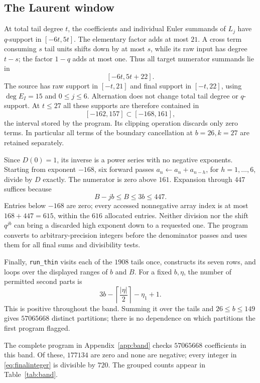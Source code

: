 \subsection{The Laurent window}
At total tail degree \(t\), the coefficients and individual Euler
summands of \(L_j\) have \(q\)-support in \([-6t,5t]\).
The elementary factor adds at most \(21\). A cross term consuming
\(s\) tail units shifts down by at most \(s\), while its raw input has
degree \(t-s\); the factor \(1-q\) adds at most one.
Thus all target numerator summands lie in
\[
                      [-6t,5t+22].
\]
The source has raw support in \([-t,21]\) and final support in
\([-t,22]\), using \(\deg E_I=15\) and \(0\le j\le6\).
Alternation does not change total tail degree or \(q\)-support.
At \(t\le27\) all these supports are therefore contained in
\[
                       [-162,157]\subset[-168,161],
\]
the interval stored by the program. Its clipping operation discards
only zero terms. In particular all terms of the boundary cancellation
at \(b=26,k=27\) are retained separately.

Since \(D(0)=1\), its inverse is a power series with no negative
exponents. Starting from exponent \(-168\), six forward passes
\(a_n\gets a_n+a_{n-h}\), for \(h=1,\ldots,6\), divide by \(D\)
exactly. The numerator is zero above \(161\).
Expansion through \(447\) suffices because
\[
                         B-jb\le B\le3b\le447.
\]
Entries below \(-168\) are zero; every accessed nonnegative array index
is at most \(168+447=615\), within the \(616\) allocated entries.
Neither division nor the shift \(q^{jb}\) can bring a discarded high
exponent down to a requested one. The program converts to
arbitrary-precision integers before the denominator passes and uses them
for all final sums and divisibility tests.

Finally, \texttt{run\_thin} visits each of the \(1908\) tails once,
constructs its seven rows, and loops over the displayed ranges of
\(b\) and \(B\). For a fixed \(b,\eta\), the number of permitted
second parts is
\[
       3b-\left\lceil\frac{|\eta|}{2}\right\rceil-\eta_1+1.
\]
This is positive throughout the band. Summing it over the tails and
\(26\le b\le149\) gives \(57065668\) distinct partitions; there is
no dependence on which partitions the first program flagged.

\begin{verification}\label{ver:band}
The complete program in Appendix~\ref{app:band} checks \(57065668\)
coefficients in this band. Of these, \(177134\) are zero and none are
negative; every integer in \eqref{eq:finalinteger} is divisible by \(720\).
The grouped counts appear in Table~\ref{tab:band}.
\end{verification}
